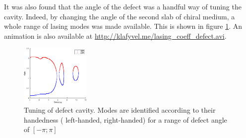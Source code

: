 It was also found that the angle of the defect was a handful way of tuning the cavity. Indeed, by changing the angle of the second slab of chiral medium, a whole range of lasing modes was made available. This is shown in figure \ref{fig:defect_cavity:tuning}. An animation is also available at \url{http://klafyvel.me/lasing_coeff_defect.avi}.
\begin{figure} %
	\capstart
	\centering
	\includegraphics[width=0.30\textwidth]{plots/defect/tuning}
	\caption[Tuning of defect cavity]{Tuning of defect cavity. Modes are identified according to their handedness (\protect{} left-handed, \protect{} right-handed) for a range of defect angle of $[-\pi;\pi]$}
	\label{fig:defect_cavity:tuning}
\end{figure}

